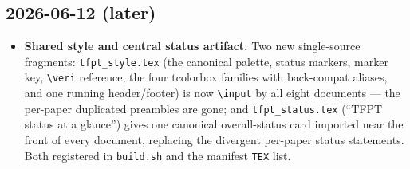 \documentclass[11pt]{article}
\begin{document}
\subsection*{2026-06-12 (later)}
\begin{itemize}
\item \textbf{Shared style and central status artifact.} Two new single-source fragments:
  \texttt{tfpt\_style.tex} (the canonical palette, status markers, marker key, \texttt{\textbackslash veri}
  reference, the four tcolorbox families with back-compat aliases, and one running header/footer)
  is now \texttt{\textbackslash input} by all eight documents --- the per-paper duplicated preambles
  are gone; and \texttt{tfpt\_status.tex} (``TFPT status at a glance'') gives one canonical overall-status
  card imported near the front of every document, replacing the divergent per-paper status statements.
  Both registered in \texttt{build.sh} and the manifest \texttt{TEX} list.
\end{itemize}
\end{document}
